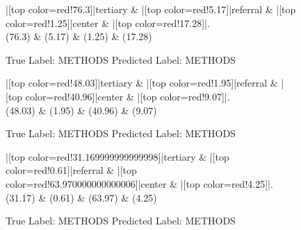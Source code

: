 \documentclass[a4paper, landscape]{article}
\begin{document}
\clearpage
\begin{figure}
\begin{center}
\begin{dependency}
\begin{deptext}
|[top color=red!76.3]|tertiary \& |[top color=red!5.17]|referral \& |[top color=red!1.25]|center \& |[top color=red!17.28]|.\\
(76.3) \& (5.17) \& (1.25) \& (17.28)\\
\end{deptext}
\end{dependency}
\end{center}
\caption{True Label: METHODS Predicted Label: METHODS}
\end{figure}
\clearpage
\begin{figure}
\begin{center}
\begin{dependency}
\begin{deptext}
|[top color=red!48.03]|tertiary \& |[top color=red!1.95]|referral \& |[top color=red!40.96]|center \& |[top color=red!9.07]|.\\
(48.03) \& (1.95) \& (40.96) \& (9.07)\\
\end{deptext}
\end{dependency}
\end{center}
\caption{True Label: METHODS Predicted Label: METHODS}
\end{figure}
\clearpage
\begin{figure}
\begin{center}
\begin{dependency}
\begin{deptext}
|[top color=red!31.169999999999998]|tertiary \& |[top color=red!0.61]|referral \& |[top color=red!63.970000000000006]|center \& |[top color=red!4.25]|.\\
(31.17) \& (0.61) \& (63.97) \& (4.25)\\
\end{deptext}
\end{dependency}
\end{center}
\caption{True Label: METHODS Predicted Label: METHODS}
\end{figure}
\end{document}
